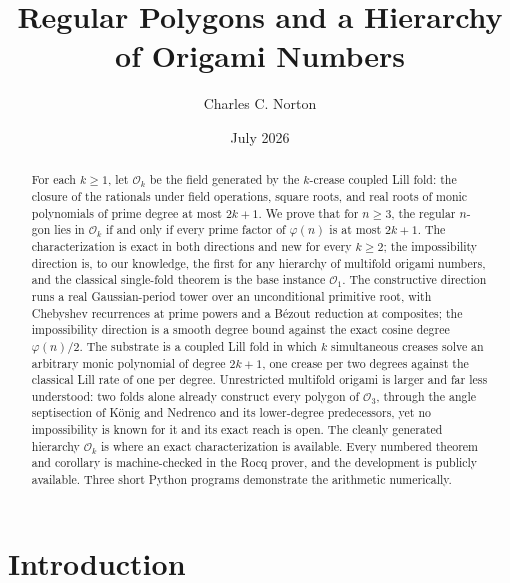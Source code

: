 \documentclass[11pt]{amsart}
\theoremstyle{plain}
\theoremstyle{definition}
\newcommand{\Ok}{\mathscr{O}_k}
\newcommand{\Onum}[1]{\mathscr{O}_{#1}}
\begin{document}
\title{Regular Polygons and a Hierarchy of Origami Numbers}
\author{Charles C. Norton}
\address{Long Island, New York}
\date{July 2026}

\begin{abstract}
For each $k \ge 1$, let $\Ok$ be the field generated by the $k$-crease coupled Lill fold: the closure of the rationals under field operations, square roots, and real roots of monic polynomials of prime degree at most $2k+1$. We prove that for $n \ge 3$, the regular $n$-gon lies in $\Ok$ if and only if every prime factor of $\varphi(n)$ is at most $2k+1$. The characterization is exact in both directions and new for every $k \ge 2$; the impossibility direction is, to our knowledge, the first for any hierarchy of multifold origami numbers, and the classical single-fold theorem is the base instance $\Onum{1}$. The constructive direction runs a real Gaussian-period tower over an unconditional primitive root, with Chebyshev recurrences at prime powers and a B\'ezout reduction at composites; the impossibility direction is a smooth degree bound against the exact cosine degree $\varphi(n)/2$. The substrate is a coupled Lill fold in which $k$ simultaneous creases solve an arbitrary monic polynomial of degree $2k+1$, one crease per two degrees against the classical Lill rate of one per degree. Unrestricted multifold origami is larger and far less understood: two folds alone already construct every polygon of $\Onum{3}$, through the angle septisection of K\"onig and Nedrenco and its lower-degree predecessors, yet no impossibility is known for it and its exact reach is open. The cleanly generated hierarchy $\Ok$ is where an exact characterization is available. Every numbered theorem and corollary is machine-checked in the Rocq prover, and the development is publicly available. Three short Python programs demonstrate the arithmetic numerically.
\end{abstract}

\maketitle

\section{Introduction}
\end{document}
